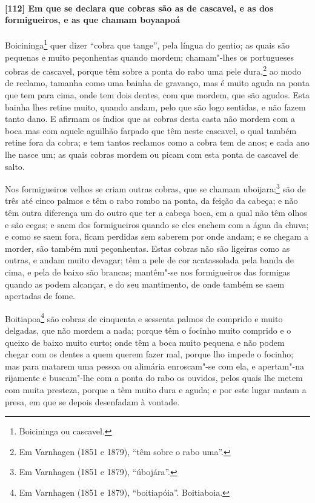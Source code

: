 \paragraph{[112] Em que se declara que cobras são as de cascavel, e as dos formigueiros, e
as que chamam boyaapoá}\quad
Boicininga\footnote{ Boicininga ou cascavel.} quer dizer ``cobra que tange'', pela língua
do gentio; as quais são pequenas e muito peçonhentas quando mordem; chamam"-lhes os
portugueses cobras de cascavel, porque têm sobre a ponta do rabo uma pele dura,\footnote{
Em Varnhagen (1851 e 1879), ``têm sobre o rabo uma''.} ao modo de reclamo, tamanha como
uma bainha de gravanço, mas é muito aguda na ponta que tem para cima, onde tem dois
dentes, com que mordem, que são agudos. Esta bainha lhes retine muito, quando andam, pelo
que são logo sentidas, e não fazem tanto dano. E afirmam os índios que as cobras desta
casta não mordem com a boca mas com aquele aguilhão farpado que têm neste cascavel, o qual
também retine fora da cobra; e tem tantos reclamos como a cobra tem de anos; e cada ano
lhe nasce um; as quais cobras mordem ou picam com esta ponta de cascavel de salto.

Nos formigueiros velhos se criam outras cobras, que se chamam uboijara;\footnote{ Em
Varnhagen (1851 e 1879), ``úbojára''.} são de três até cinco palmos e têm o rabo rombo na
ponta, da feição da cabeça; e não têm outra diferença um do outro que ter a cabeça boca,
em a qual não têm olhos e são cegas; e saem dos formigueiros quando se eles enchem com a
água da chuva; e como se saem fora, ficam perdidas sem saberem por onde andam; e se chegam
a morder, são também mui peçonhentas. Estas cobras não são ligeiras como as outras, e
andam muito devagar; têm a pele de cor acatassolada pela banda de cima, e pela de baixo
são brancas; mantêm"-se nos formigueiros das formigas quando as podem alcançar, e do seu
mantimento, de onde também se saem apertadas de fome.

Boitiapoa\footnote{ Em Varnhagen (1851 e 1879), ``boitiapóia''. Boitiaboia.} são cobras de
cinquenta e sessenta palmos de comprido e muito delgadas, que não mordem a nada; porque
têm o focinho muito comprido e o queixo de baixo muito curto; onde têm a boca muito
pequena e não podem chegar com os dentes a quem querem fazer mal, porque lho impede o
focinho; mas para matarem uma pessoa ou alimária enroscam"-se com ela, e apertam"-na
rijamente e buscam"-lhe com a ponta do rabo os ouvidos, pelos quais lhe metem com muita
presteza, porque a têm muito dura e aguda; e por este lugar matam a presa, em que se
depois desenfadam à vontade.

